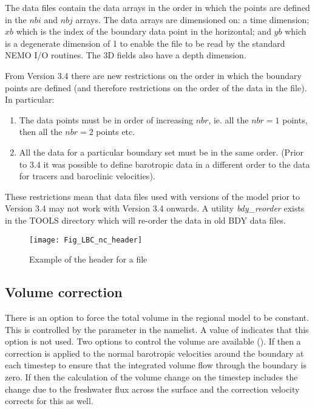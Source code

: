 \documentclass[../main/NEMO_manual]{subfiles}
\begin{document}
The data files contain the data arrays in the order in which the points are defined in the $nbi$ and $nbj$ arrays.
The data arrays are dimensioned on:
a time dimension;
$xb$ which is the index of the boundary data point in the horizontal;
and $yb$ which is a degenerate dimension of 1 to enable the file to be read by the standard NEMO I/O routines.
The 3D fields also have a depth dimension. 

From Version 3.4 there are new restrictions on the order in which the boundary points are defined
(and therefore restrictions on the order of the data in the file).
In particular:

\begin{enumerate}
\item The data points must be in order of increasing $nbr$,
  ie. all the $nbr=1$ points, then all the $nbr=2$ points etc.
\item All the data for a particular boundary set must be in the same order.
  (Prior to 3.4 it was possible to define barotropic data in a different order to
  the data for tracers and baroclinic velocities). 
\end{enumerate}

These restrictions mean that data files used with versions of the
model prior to Version 3.4 may not work with Version 3.4 onwards.
A \fortran utility {\it bdy\_reorder} exists in the TOOLS directory which
will re-order the data in old BDY data files.

\begin{figure}[!t]
  \begin{center}
    \texttt{[image: Fig\_LBC\_nc\_header]}
    \caption {
      \protect\label{fig:LBC_nc_header}
      Example of the header for a \protect{} file
    }
  \end{center}
\end{figure}

\subsection{Volume correction}
\label{subsec:BDY_vol_corr}

There is an option to force the total volume in the regional model to be constant.
This is controlled  by the  parameter in the namelist.
A value of  indicates that this option is not used.
Two options to control the volume are available (). 
If  then a correction is applied to the normal barotropic velocities around the boundary at
each timestep to ensure that the integrated volume flow through the boundary is zero.
If  then the calculation of the volume change on
the timestep includes the change due to the freshwater flux across the surface and
the correction velocity corrects for this as well.
\end{document}
